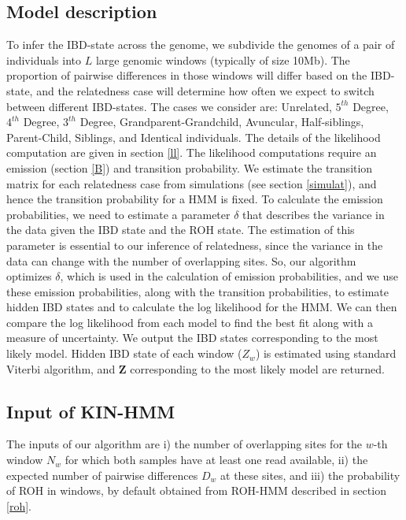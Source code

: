 \documentclass[12pt, letterpaper]{article}
\newcommand{\BZ}{\mathbf{Z}}
\begin{document}
\subsection{Model description}\label{method_overview} 
To infer the IBD-state across the genome, we subdivide the genomes of a pair of individuals into $L$ large genomic windows (typically of size 10Mb). The proportion of pairwise differences in those windows will differ based on the IBD-state, and the relatedness case will determine how often we expect to switch between different IBD-states.  The cases we consider are:  Unrelated, $5^{th}$ Degree, $4^{th}$ Degree, $3^{th}$ Degree, Grandparent-Grandchild, Avuncular, Half-siblings, Parent-Child, Siblings, and Identical individuals. The details of the likelihood computation are given in section \ref{ll}. The likelihood computations require an emission (section \ref{B}) and transition probability.  We estimate the transition matrix for each relatedness case from simulations (see section \ref{simulat}), and hence the transition probability for a HMM is fixed. To calculate the emission probabilities, we need to estimate a parameter $\delta$ that describes the variance in the data given the IBD state and the ROH state. The estimation of this parameter is essential to our inference of relatedness, since the variance in the data can change with the number of overlapping sites. So, our algorithm optimizes $\delta$, which is used in the calculation of emission probabilities, and we use these emission probabilities, along with the transition probabilities, to estimate hidden IBD states and to calculate the log likelihood for the HMM. We can then compare the log likelihood from each model to find the best fit along with a measure of uncertainty. We output the IBD states corresponding to the most likely model. 
Hidden IBD state of each window ($Z_w$) is estimated using standard Viterbi algorithm, and $\BZ$ corresponding to the most likely model are returned. 


\subsection{Input of KIN-HMM}\label{hmm_input}
The inputs of our algorithm are i) the number of overlapping sites for the $w$-th window $N_w$ for which both samples have at least one read available, ii) the expected number of pairwise differences $D_w$ at these sites, and iii) the probability of ROH in windows, by default obtained from ROH-HMM described in section \ref{roh}.
\end{document}
